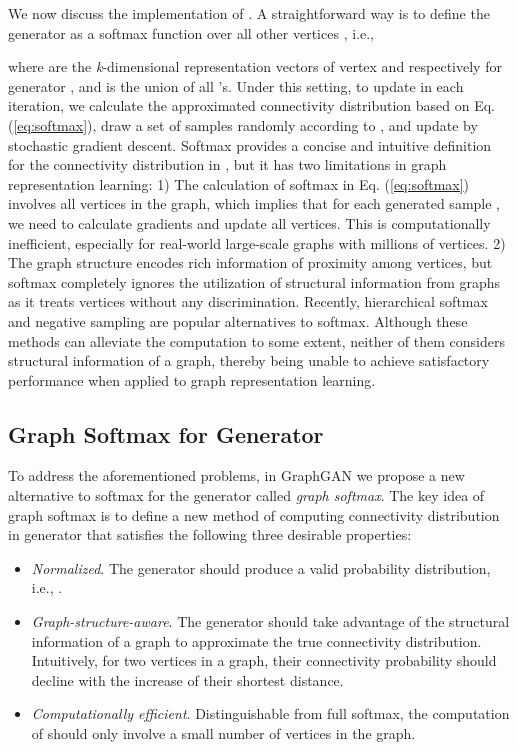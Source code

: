 \documentclass[letterpaper]{article}
\begin{document}
		We now discuss the implementation of .
		A straightforward way is to define the generator as a softmax function over all other vertices \cite{wang2017irgan}, i.e.,
		
		where  are the \textit{k}-dimensional representation vectors of vertex  and  respectively for generator , and  is the union of all 's.
		Under this setting, to update  in each iteration, we calculate the approximated connectivity distribution  based on Eq. (\ref{eq:softmax}), draw a set of samples  randomly according to , and update  by stochastic gradient descent.
		Softmax provides a concise and intuitive definition for the connectivity distribution in , but it has two limitations in graph representation learning:
		1) The calculation of softmax in Eq. (\ref{eq:softmax}) involves all vertices in the graph, which implies that for each generated sample , we need to calculate gradients  and update all vertices.
		This is computationally inefficient, especially for real-world large-scale graphs with millions of vertices.
		2) The graph structure encodes rich information of proximity among vertices, but softmax completely ignores the utilization of structural information from graphs as it treats vertices without any discrimination.
		Recently, hierarchical softmax \cite{morin2005hierarchical} and negative sampling \cite{mikolov2013distributed} are popular alternatives to softmax.
		Although these methods can alleviate the computation to some extent, neither of them considers structural information of a graph, thereby being unable to achieve satisfactory performance when applied to graph representation learning.
	
	
	\subsection{Graph Softmax for Generator}
		To address the aforementioned problems, in GraphGAN we propose a new alternative to softmax for the generator called \textit{graph softmax}.
		The key idea of graph softmax is to define a new method of computing connectivity distribution in generator  that satisfies the following three desirable properties:
		\begin{itemize}
			\item
				\textit{Normalized}.
				The generator should produce a valid probability distribution, i.e., .
			\item
				\textit{Graph-structure-aware}.
				The generator should take advantage of the structural information of a graph to approximate the true connectivity distribution.
				Intuitively, for two vertices in a graph, their connectivity probability should decline with the increase of their shortest distance.
			\item
				\textit{Computationally efficient}.
				Distinguishable from full softmax, the computation of  should only involve a small number of vertices in the graph.
		\end{itemize}
		
\end{document}
